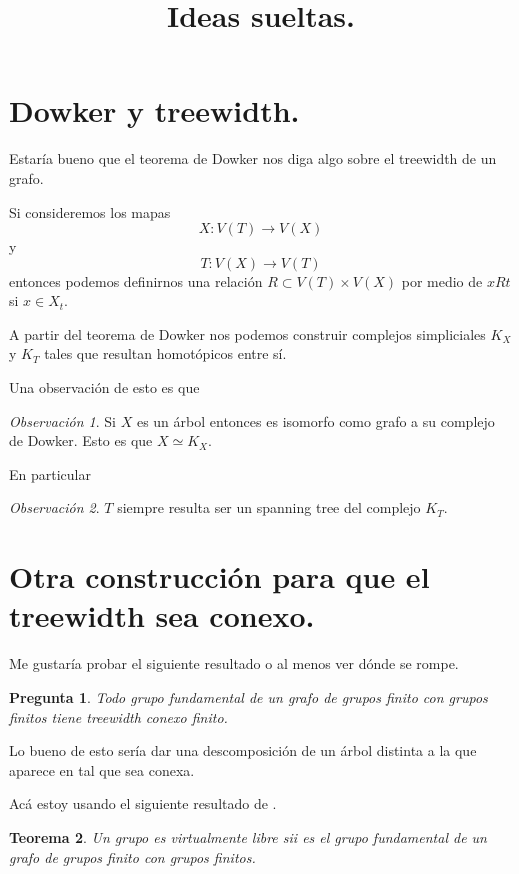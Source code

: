 \documentclass[12pt]{article}
\title{Ideas sueltas.}
\date{}
\theoremstyle{plain} %
\newtheorem{teo}{\color{rojo} Teorema}[section]
\newtheorem{preg}[teo]{\color{rojo} Pregunta}
\theoremstyle{definition}
\theoremstyle{remark}
\newtheorem{obs}{\color{orange!85!white} Observación}[section]
\begin{document}
	
	
\maketitle
	
\section{Dowker y treewidth.}	

Estaría bueno que el teorema de Dowker nos diga algo sobre el treewidth de un grafo.

Si consideremos los mapas
\[
X: V(T) \to V(X)
\]
y 
\[
T: V(X) \to V(T)
\]
entonces podemos definirnos una relación $R \subset V(T) \times V(X)$ por medio de $xRt$ si $x \in X_t$.

A partir del teorema de Dowker nos podemos construir complejos simpliciales $K_X$ y $K_T$ tales que resultan homotópicos entre sí.


Una observación de esto es que 
\begin{obs}
	Si $X$ es un árbol entonces es isomorfo como grafo a su complejo de Dowker. 
	Esto es que $X \simeq K_X$.
\end{obs}

En particular 

\begin{obs}
	$T$ siempre resulta ser un spanning tree del complejo $K_T$.
\end{obs}
	
\section{Otra construcción para que el treewidth sea conexo.}	

Me gustaría probar el siguiente resultado o al menos ver dónde se rompe.

\begin{preg}
	Todo grupo fundamental de un grafo de grupos finito con grupos finitos tiene treewidth conexo finito.
\end{preg}

Lo bueno de esto sería dar una descomposición de un árbol distinta a la que aparece en \cite{diekert_contextfree_2017} tal que sea conexa.

Acá estoy usando el siguiente resultado de \cite{karrass1973finite}.
\begin{teo}
	Un grupo es virtualmente libre sii es el grupo fundamental de un grafo de grupos finito con grupos finitos.
\end{teo}
\end{document}
